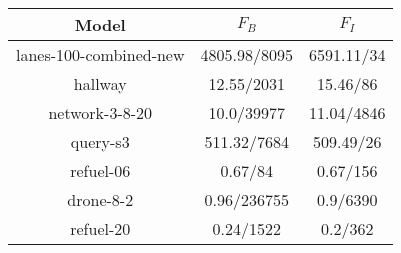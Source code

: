 \begin{table}
\begin{tabular}{|c|c|c|}
\hline

Model & $F_{B}$ & $F_{I}$ \\ \hline 

lanes-100-combined-new & 4805.98/8095 & 6591.11/34 \\ 
\hline
hallway & 12.55/2031 & 15.46/86 \\ 
\hline
network-3-8-20 & 10.0/39977 & 11.04/4846 \\ 
\hline
query-s3 & 511.32/7684 & 509.49/26 \\ 
\hline
refuel-06 & 0.67/84 & 0.67/156 \\ 
\hline
drone-8-2 & 0.96/236755 & 0.9/6390 \\ 
\hline
refuel-20 & 0.24/1522 & 0.2/362 \\ 
\hline

\end{tabular}
\end{table}

